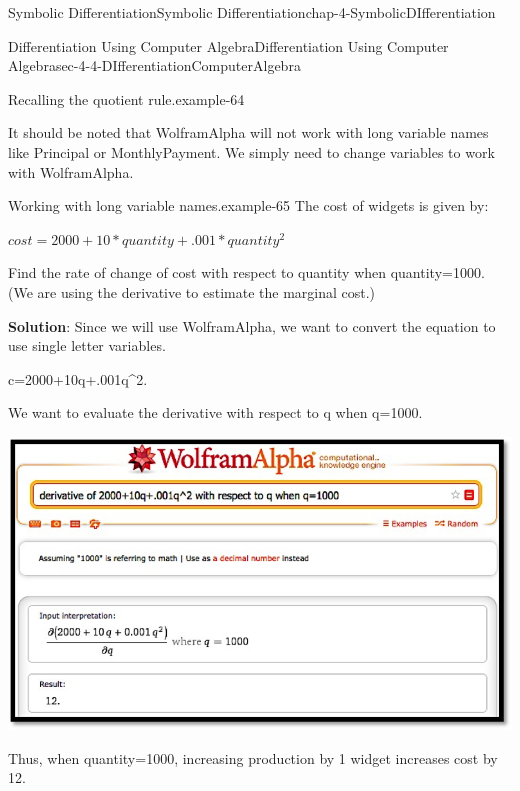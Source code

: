 \documentclass[oneside,10pt,]{book}
\newcommand{\terminology}[1]{\textbf{#1}}
\numberwithin{equation}{section}
\begin{document}
\begin{chapterptx}{Symbolic Differentiation}{}{Symbolic Differentiation}{}{}{chap-4-SymbolicDIfferentiation}
\begin{sectionptx}{Differentiation Using Computer Algebra}{}{Differentiation Using Computer Algebra}{}{}{sec-4-4-DIfferentiationComputerAlgebra}
\begin{example}{Recalling the quotient rule.}{example-64}
\begin{sidebyside}{1}{0.15}{0.15}{0}
\begin{sbspanel}{0.7}
\end{sbspanel}%
\end{sidebyside}%
\end{example}
\hypertarget{p-1719}{}%
It should be noted that Wolfram\textbar{}Alpha will not work with long variable names like Principal or MonthlyPayment.  We simply need to change variables to work with Wolfram\textbar{}Alpha.%
\begin{example}{Working with long variable names.}{example-65}%
\hypertarget{p-1720}{}%
The cost of widgets is given by:%
\par
\hypertarget{p-1721}{}%
\(cost=2000+10*quantity+.001*quantity^2\)%
\par
\hypertarget{p-1722}{}%
Find the rate of change of cost with respect to quantity when quantity=1000.  (We are using the derivative to estimate the marginal cost.)%
\par
\hypertarget{p-1723}{}%
\terminology{Solution}: Since we will use Wolfram\textbar{}Alpha, we want to convert the equation to use single letter variables.%
\par
\hypertarget{p-1724}{}%
c=2000+10\textasteriskcentered{}q+.001\textasteriskcentered{}q\textasciicircum{}2.%
\par
\hypertarget{p-1725}{}%
We want to evaluate the derivative with respect to q when q=1000.%
\begin{sidebyside}{1}{0.05}{0.05}{0}%
\begin{sbspanel}{0.9}%
\includegraphics[width=1\linewidth]{images/sec4-4-5.png}
\end{sbspanel}%
\end{sidebyside}%
\par
\hypertarget{p-1726}{}%
Thus, when quantity=1000, increasing production by 1 widget increases cost by \textdollar{}12.%
\end{example}

\end{sectionptx}
\end{chapterptx}
\end{document}
